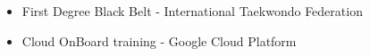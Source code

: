 \vspace{5mm}
\begin{itemize}
    \setlength{\itemindent}{2em}
    \item First Degree Black Belt - International Taekwondo Federation
    \item Cloud OnBoard training - Google Cloud Platform
\end{itemize}
